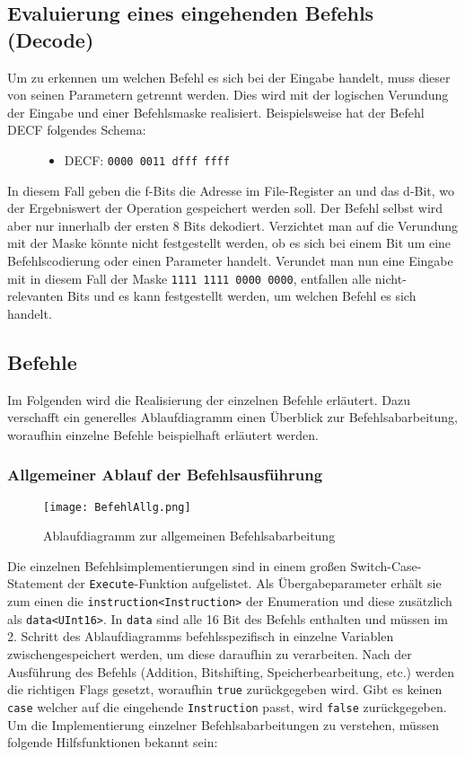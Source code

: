 \documentclass[
10pt, %
a4paper, %
oneside, %
headinclude,footinclude, %
BCOR5mm, %
]{scrartcl}
\begin{document}
	\subsection{Evaluierung eines eingehenden Befehls (Decode)}
		Um zu erkennen um welchen Befehl es sich bei der Eingabe handelt, muss dieser von seinen Parametern getrennt werden. Dies wird mit der logischen Verundung der Eingabe und einer Befehlsmaske realisiert. Beispielsweise hat der Befehl DECF folgendes Schema:
		
		\begin{figure}[h]
			\begin{itemize}
				\item DECF: \texttt{0000 0011 dfff ffff}
			\end{itemize}
		\end{figure}
		In diesem Fall geben die f-Bits die Adresse im File-Register an und das d-Bit, wo der Ergebniswert der Operation gespeichert werden soll. Der Befehl selbst wird aber nur innerhalb der ersten 8 Bits dekodiert. Verzichtet man auf die Verundung mit der Maske könnte nicht festgestellt werden, ob es sich bei einem Bit um eine Befehlscodierung oder einen Parameter handelt. Verundet man nun eine Eingabe mit in diesem Fall der Maske \texttt{1111 1111 0000 0000}, entfallen alle nicht-relevanten Bits und es kann festgestellt werden, um welchen Befehl es sich handelt.
	\subsection{Befehle}
		Im Folgenden wird die Realisierung der einzelnen Befehle erläutert. Dazu verschafft ein generelles Ablaufdiagramm einen Überblick zur Befehlsabarbeitung, woraufhin einzelne Befehle beispielhaft erläutert werden.
		\subsubsection{Allgemeiner Ablauf der Befehlsausführung}
		
			\begin{figure}[h]
				\begin{center}
					\texttt{[image: BefehlAllg.png]}
					\caption{Ablaufdiagramm zur allgemeinen Befehlsabarbeitung}
				\end{center}
			\end{figure}
		
			Die einzelnen Befehlsimplementierungen sind in einem großen Switch-Case-Statement der \texttt{Execute}-Funktion aufgelistet. Als Übergabeparameter erhält sie zum einen die \texttt{instruction<Instruction>} der Enumeration und diese zusätzlich als \texttt{data<UInt16>}. In \texttt{data} sind alle 16 Bit des Befehls enthalten und müssen im 2. Schritt des Ablaufdiagramms befehlsspezifisch in einzelne Variablen zwischengespeichert werden, um diese daraufhin zu verarbeiten.  
			Nach der Ausführung des Befehls (Addition, Bitshifting, Speicherbearbeitung, etc.) werden die richtigen Flags gesetzt, woraufhin \texttt{true} zurückgegeben wird. Gibt es keinen \texttt{case} welcher auf die eingehende \texttt{Instruction} passt, wird \texttt{false} zurückgegeben.
		\newpage
		Um die Implementierung einzelner Befehlsabarbeitungen zu verstehen, müssen folgende Hilfsfunktionen bekannt sein:
\end{document}
